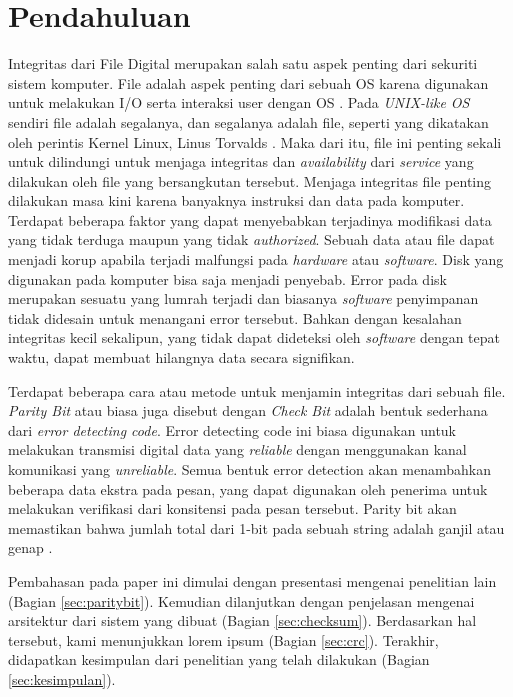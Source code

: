 \section{Pendahuluan}
\label{sec:pendahuluan}


Integritas dari File Digital merupakan salah satu aspek penting dari sekuriti sistem komputer. File adalah aspek penting dari sebuah OS karena digunakan untuk melakukan I/O serta interaksi user dengan OS \citep{stallings2008}. Pada \emph{UNIX-like OS} sendiri file adalah segalanya, dan segalanya adalah file, seperti yang dikatakan oleh perintis Kernel Linux, Linus Torvalds \cite{everythingisafile}. Maka dari itu, file ini penting sekali untuk dilindungi untuk menjaga integritas dan \emph{availability} dari \emph{service} yang dilakukan oleh file yang bersangkutan tersebut. Menjaga integritas file penting dilakukan masa kini karena banyaknya instruksi dan data pada komputer. Terdapat beberapa faktor yang dapat menyebabkan terjadinya modifikasi data yang tidak terduga maupun yang tidak \emph{authorized}. Sebuah data atau file dapat menjadi korup apabila terjadi malfungsi pada \emph{hardware} atau \emph{software}. Disk yang digunakan pada komputer bisa saja menjadi penyebab. Error pada disk merupakan sesuatu yang lumrah terjadi \citep{prabhakaran2005} dan biasanya \emph{software} penyimpanan tidak didesain untuk menangani error tersebut. Bahkan dengan kesalahan integritas kecil sekalipun, yang tidak dapat dideteksi oleh \emph{software} dengan tepat waktu, dapat membuat hilangnya data secara signifikan. 

Terdapat beberapa cara atau metode untuk menjamin integritas dari sebuah file. \emph{Parity Bit} atau biasa juga disebut dengan \emph{Check Bit} adalah bentuk sederhana dari \emph{error detecting code}. Error detecting code ini biasa digunakan untuk melakukan transmisi digital data yang \emph{reliable} dengan menggunakan kanal komunikasi yang \emph{unreliable}. Semua bentuk error detection akan menambahkan beberapa data ekstra pada pesan, yang dapat digunakan oleh penerima untuk melakukan verifikasi dari konsitensi pada pesan tersebut. Parity bit akan memastikan bahwa jumlah total dari 1-bit pada sebuah string adalah ganjil atau genap \citep{rodger2015}.

Pembahasan pada paper ini dimulai dengan presentasi mengenai penelitian lain (Bagian \ref{sec:paritybit}).
Kemudian dilanjutkan dengan penjelasan mengenai arsitektur dari sistem yang dibuat (Bagian \ref{sec:checksum}).
Berdasarkan hal tersebut, kami menunjukkan lorem ipsum (Bagian \ref{sec:crc}).
Terakhir, didapatkan kesimpulan dari penelitian yang telah dilakukan (Bagian \ref{sec:kesimpulan}).
